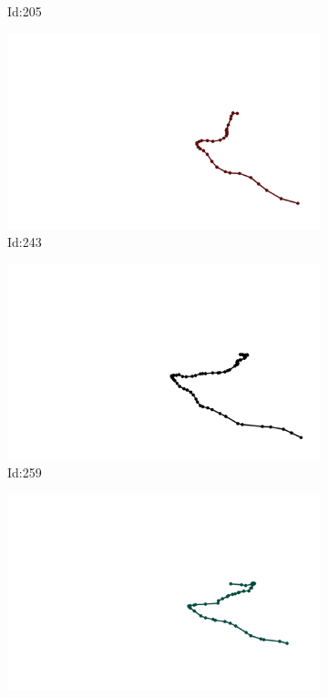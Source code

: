 \documentclass[12pt,twoside]{report}
\begin{document}
\begin{figure}
\begin{subfigure}[b]{0.20\textwidth}
\caption{Id:205}
\end{subfigure}
\begin{subfigure}[b]{0.20\textwidth}
\centering
\includegraphics[width=\textwidth]{../trajectories/243.png}
\caption{Id:243}
\end{subfigure}
\begin{subfigure}[b]{0.20\textwidth}
\centering
\includegraphics[width=\textwidth]{../trajectories/259.png}
\caption{Id:259}
\end{subfigure}
\begin{subfigure}[b]{0.20\textwidth}
\centering
\includegraphics[width=\textwidth]{../trajectories/283.png}

\end{subfigure}
\end{figure}
\end{document}
